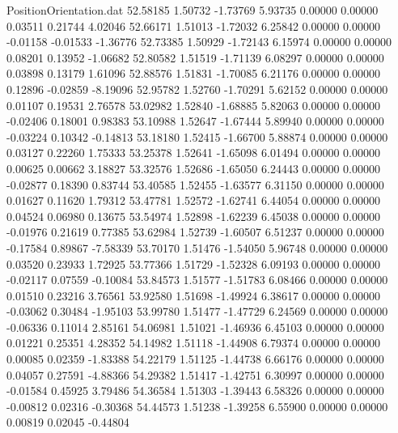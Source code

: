 \begin{filecontents}{PositionOrientation.dat}
  52.58185    1.50732   -1.73769     5.93735    0.00000    0.00000    0.03511    0.21744    4.02046
  52.66171    1.51013   -1.72032     6.25842    0.00000    0.00000   -0.01158   -0.01533   -1.36776
  52.73385    1.50929   -1.72143     6.15974    0.00000    0.00000    0.08201    0.13952   -1.06682
  52.80582    1.51519   -1.71139     6.08297    0.00000    0.00000    0.03898    0.13179    1.61096
  52.88576    1.51831   -1.70085     6.21176    0.00000    0.00000    0.12896   -0.02859   -8.19096
  52.95782    1.52760   -1.70291     5.62152    0.00000    0.00000    0.01107    0.19531    2.76578
  53.02982    1.52840   -1.68885     5.82063    0.00000    0.00000   -0.02406    0.18001    0.98383
  53.10988    1.52647   -1.67444     5.89940    0.00000    0.00000   -0.03224    0.10342   -0.14813
  53.18180    1.52415   -1.66700     5.88874    0.00000    0.00000    0.03127    0.22260    1.75333
  53.25378    1.52641   -1.65098     6.01494    0.00000    0.00000    0.00625    0.00662    3.18827
  53.32576    1.52686   -1.65050     6.24443    0.00000    0.00000   -0.02877    0.18390    0.83744
  53.40585    1.52455   -1.63577     6.31150    0.00000    0.00000    0.01627    0.11620    1.79312
  53.47781    1.52572   -1.62741     6.44054    0.00000    0.00000    0.04524    0.06980    0.13675
  53.54974    1.52898   -1.62239     6.45038    0.00000    0.00000   -0.01976    0.21619    0.77385
  53.62984    1.52739   -1.60507     6.51237    0.00000    0.00000   -0.17584    0.89867   -7.58339
  53.70170    1.51476   -1.54050     5.96748    0.00000    0.00000    0.03520    0.23933    1.72925
  53.77366    1.51729   -1.52328     6.09193    0.00000    0.00000   -0.02117    0.07559   -0.10084
  53.84573    1.51577   -1.51783     6.08466    0.00000    0.00000    0.01510    0.23216    3.76561
  53.92580    1.51698   -1.49924     6.38617    0.00000    0.00000   -0.03062    0.30484   -1.95103
  53.99780    1.51477   -1.47729     6.24569    0.00000    0.00000   -0.06336    0.11014    2.85161
  54.06981    1.51021   -1.46936     6.45103    0.00000    0.00000    0.01221    0.25351    4.28352
  54.14982    1.51118   -1.44908     6.79374    0.00000    0.00000    0.00085    0.02359   -1.83388
  54.22179    1.51125   -1.44738     6.66176    0.00000    0.00000    0.04057    0.27591   -4.88366
  54.29382    1.51417   -1.42751     6.30997    0.00000    0.00000   -0.01584    0.45925    3.79486
  54.36584    1.51303   -1.39443     6.58326    0.00000    0.00000   -0.00812    0.02316   -0.30368
  54.44573    1.51238   -1.39258     6.55900    0.00000    0.00000    0.00819    0.02045   -0.44804

\end{filecontents}
